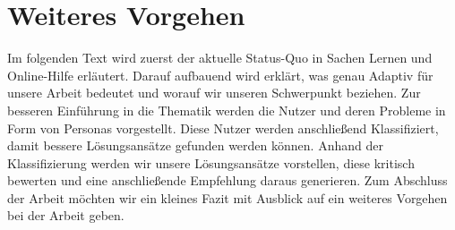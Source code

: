\section{Weiteres Vorgehen}
Im folgenden Text wird zuerst der aktuelle Status-Quo in Sachen Lernen und Online-Hilfe erläutert. Darauf aufbauend wird erklärt, was genau Adaptiv für unsere Arbeit bedeutet und worauf wir unseren Schwerpunkt beziehen. Zur besseren Einführung in die Thematik werden die Nutzer und deren Probleme in Form von Personas vorgestellt. Diese Nutzer werden anschließend Klassifiziert, damit bessere Lösungsansätze gefunden werden können. Anhand der Klassifizierung werden wir unsere Lösungsansätze vorstellen, diese kritisch bewerten und eine anschließende Empfehlung daraus generieren. Zum Abschluss der Arbeit möchten wir ein kleines Fazit mit Ausblick auf ein weiteres Vorgehen bei der Arbeit geben.


